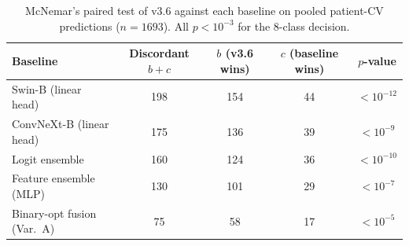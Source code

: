 \begin{table}[t]
\centering
\small
\caption{McNemar's paired test of v3.6 against each baseline on pooled patient-CV predictions ($n=1693$). All $p<10^{-3}$ for the 8-class decision.}
\label{tab:mcnemar_results}
\begin{tabular}{lcccc}
\toprule
\textbf{Baseline} & \textbf{Discordant $b{+}c$} & \textbf{$b$ (v3.6 wins)} & \textbf{$c$ (baseline wins)} & \textbf{$p$-value} \\
\midrule
Swin-B (linear head)        & 198 & 154 & 44 & $<10^{-12}$ \\
ConvNeXt-B (linear head)    & 175 & 136 & 39 & $<10^{-9}$  \\
Logit ensemble              & 160 & 124 & 36 & $<10^{-10}$ \\
Feature ensemble (MLP)      & 130 & 101 & 29 & $<10^{-7}$  \\
Binary-opt fusion (Var.\ A) &  75 &  58 & 17 & $<10^{-5}$  \\
\bottomrule
\end{tabular}
\end{table}
